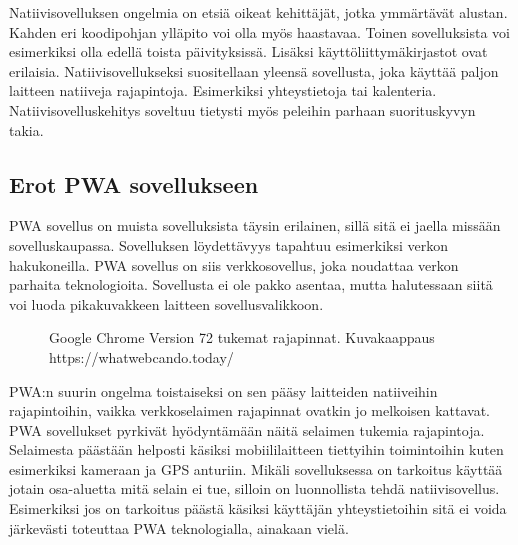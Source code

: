 \documentclass{tktltiki}
\begin{document}
Natiivisovelluksen ongelmia on etsiä oikeat kehittäjät, jotka ymmärtävät alustan. Kahden eri koodipohjan ylläpito voi olla myös haastavaa. Toinen sovelluksista voi esimerkiksi olla edellä toista päivityksissä. Lisäksi käyttöliittymäkirjastot ovat erilaisia. Natiivisovellukseksi suositellaan yleensä sovellusta, joka käyttää paljon laitteen natiiveja rajapintoja. Esimerkiksi yhteystietoja tai kalenteria. Natiivisovelluskehitys soveltuu tietysti myös peleihin parhaan suorituskyvyn takia. 

\subsection{Erot PWA sovellukseen}

PWA sovellus on muista sovelluksista täysin erilainen, sillä sitä ei jaella missään sovelluskaupassa. Sovelluksen löydettävyys tapahtuu esimerkiksi verkon hakukoneilla. PWA sovellus on siis verkkosovellus, joka noudattaa verkon parhaita teknologioita. Sovellusta ei ole pakko asentaa, mutta halutessaan siitä voi luoda pikakuvakkeen laitteen sovellusvalikkoon.

\begin{figure}[h]
\begin{center}
\caption{Google Chrome Version 72 tukemat rajapinnat. Kuvakaappaus https://whatwebcando.today/ }
\label{Selaimen rajapinnat}
\end{center}
\end{figure}
\clearpage

PWA:n suurin ongelma toistaiseksi on sen pääsy laitteiden natiiveihin rajapintoihin, vaikka verkkoselaimen rajapinnat ovatkin jo melkoisen kattavat. PWA sovellukset pyrkivät hyödyntämään näitä selaimen tukemia rajapintoja. Selaimesta päästään helposti käsiksi mobiililaitteen tiettyihin toimintoihin kuten esimerkiksi kameraan ja GPS anturiin. Mikäli sovelluksessa on tarkoitus käyttää jotain osa-aluetta mitä selain ei tue, silloin on luonnollista tehdä natiivisovellus. Esimerkiksi jos on tarkoitus päästä käsiksi käyttäjän yhteystietoihin sitä ei voida järkevästi toteuttaa PWA teknologialla, ainakaan vielä.
\end{document}
